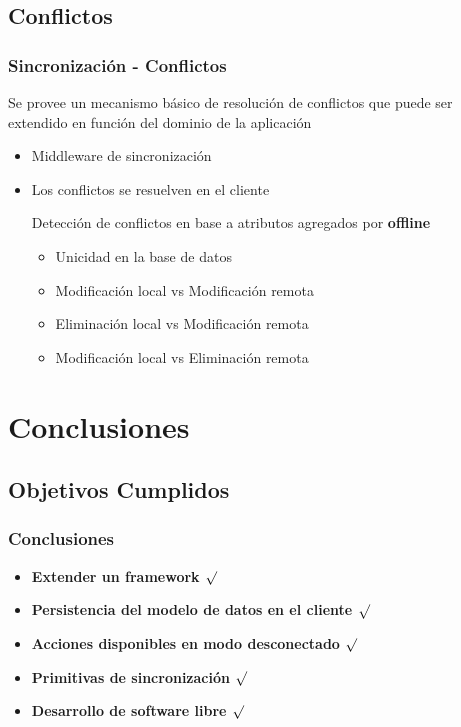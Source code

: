 \documentclass{beamer}
\begin{document}
\subsection{Conflictos}
\begin{frame}
    \frametitle{Sincronización - Conflictos}
    \par{
    Se provee un mecanismo básico de resolución de conflictos que 
    puede ser extendido en función del dominio de la aplicación
    }
    \begin{itemize}
      	\item{Middleware de sincronización}
        \item{Los conflictos se resuelven en el cliente}
        \begin{item}
        \par{
        	Detección de conflictos en base a atributos agregados por
        	{\bf offline}
        }
        \begin{itemize}
          \item{Unicidad en la base de datos}
          \item{Modificación local vs Modificación remota}
          \item{Eliminación local vs Modificación remota}
          \item{Modificación local vs Eliminación remota}
        \end{itemize}
        \end{item}        
    \end{itemize}
\end{frame}

\section{Conclusiones}
\subsection{Objetivos Cumplidos}
\begin{frame}
    \frametitle{Conclusiones}
    \begin{itemize}
        \item {\bf Extender un framework $\surd$}
        \item {\bf Persistencia del modelo de datos en el cliente $\surd$}
        \item {\bf Acciones disponibles en modo desconectado $\surd$}
        \item {\bf Primitivas de sincronización $\surd$}
        \item {\bf Desarrollo de software libre $\surd$}

    \end{itemize}
\end{frame}
\end{document}
